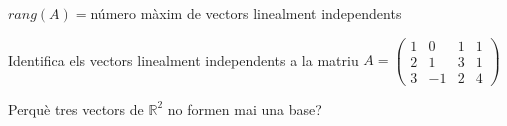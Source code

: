 \documentclass{beamer}
\begin{document}
\begin{frame}
  \begin{block}{}$rang(A)=$número màxim de vectors linealment independents\end{block}

  \begin{exercici}{}
    Identifica els vectors linealment independents a la matriu
    $A=\begin{pmatrix}
      1&0&1&1\\
      2&1&3&1\\
      3&-1&2&4
    \end{pmatrix}$
  \end{exercici}

  \begin{exercici}{}
    Perquè tres vectors de $\mathbb{R}^2$ no formen mai una base?
  \end{exercici}
\end{frame}
\end{document}
